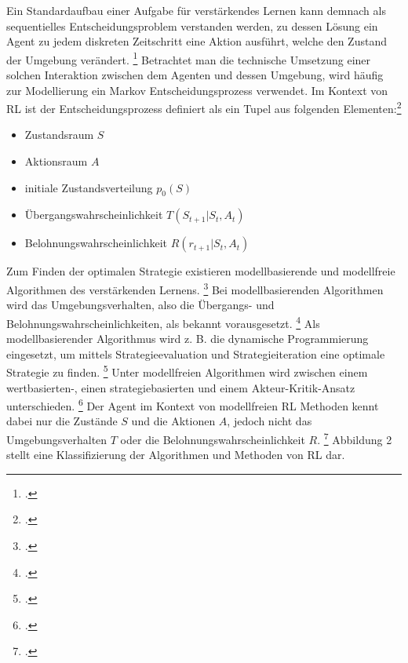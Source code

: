 Ein Standardaufbau einer Aufgabe für verstärkendes Lernen kann demnach als sequentielles Entscheidungsproblem verstanden werden, zu dessen Lösung ein Agent zu jedem diskreten Zeitschritt eine Aktion ausführt, welche den Zustand der Umgebung verändert. \footcite[Vgl.][S. 2]{Zhao.2020}
Betrachtet man die technische Umsetzung einer solchen Interaktion zwischen dem Agenten und dessen Umgebung, wird häufig zur Modellierung ein Markov Entscheidungsprozess verwendet.
Im Kontext von RL ist der Entscheidungsprozess definiert als ein Tupel aus folgenden Elementen:\footcite[Vgl.][S. 2]{Zhang.2018}
\begin{itemize}
    \item Zustandsraum $S$
    \item Aktionsraum $A$
    \item initiale Zustandsverteilung $p_{0}(S)$
    \item Übergangswahrscheinlichkeit $T(S_{t+1}|S_{t},A_{t})$
    \item Belohnungswahrscheinlichkeit $R(r_{t+1}|S_{t},A_{t})$
\end{itemize}

Zum Finden der optimalen Strategie existieren modellbasierende und modellfreie Algorithmen des verstärkenden Lernens. \footcite[Vgl.][S. 3]{Wang.2020}
Bei modellbasierenden Algorithmen wird das Umgebungsverhalten, also die Übergangs- und Belohnungswahrscheinlichkeiten, als bekannt vorausgesetzt. \footcite[Vgl.][S. 3]{Wang.2020}
Als modellbasierender Algorithmus wird z. B. die dynamische Programmierung eingesetzt, um mittels Strategieevaluation und Strategieiteration eine optimale Strategie zu finden. \footcite[Vgl.][S. 5]{Li.2019}
Unter modellfreien Algorithmen wird zwischen einem wertbasierten-, einen strategiebasierten und einem Akteur-Kritik-Ansatz unterschieden. \footcite[Vgl.][S. 5]{Li.2019}
Der Agent im Kontext von modellfreien RL Methoden kennt dabei nur die Zustände $S$ und die Aktionen $A$, jedoch nicht das Umgebungsverhalten $T$ oder die Belohnungswahrscheinlichkeit $R$. \footcite[Vgl.][S. 2]{Cutler.2014}
Abbildung 2 stellt eine Klassifizierung der Algorithmen und Methoden von RL dar.

